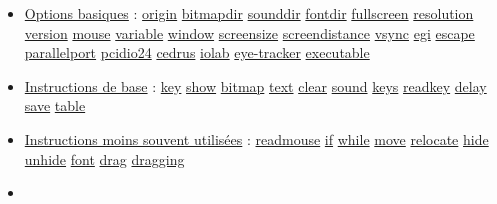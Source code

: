 \documentclass[
]{book}
\begin{document}
\begin{itemize}
\item
  \protect\hyperlink{options}{Options basiques} : \protect\hyperlink{options-origin}{origin} \textbar{} \protect\hyperlink{options-origin}{bitmapdir} \textbar{} \protect\hyperlink{options-origin}{sounddir} \textbar{} \protect\hyperlink{options-origin}{fontdir} \textbar{} \protect\hyperlink{options-fullscreen}{fullscreen} \textbar{} \protect\hyperlink{options-resolution}{resolution} \textbar{} \protect\hyperlink{options-version}{version} \textbar{} \protect\hyperlink{options-mouse}{mouse}\textbar{} \protect\hyperlink{options-variable}{variable} \textbar{} \protect\hyperlink{options-window}{window} \textbar{} \protect\hyperlink{options-screensize}{screensize} \textbar{} \protect\hyperlink{options-screendistance}{screendistance} \textbar{} \protect\hyperlink{options-vsync}{vsync} \textbar{} \protect\hyperlink{options-egi}{egi}\textbar{} \protect\hyperlink{options-escape}{escape}\textbar{} \protect\hyperlink{options-parallelport}{parallelport}\textbar{} \protect\hyperlink{options-pcidio24}{pcidio24}\textbar{} \protect\hyperlink{options-cedrus}{cedrus} \textbar{} \protect\hyperlink{options-iolab}{iolab}\textbar{} \protect\hyperlink{option-et}{eye-tracker}\textbar{} \protect\hyperlink{options-executable}{executable}
\item
  \protect\hyperlink{_commonly_used_instructions}{Instructions de base} : \protect\hyperlink{task-key}{key}\textbar{} \protect\hyperlink{task-show}{show} \textbar{} \protect\hyperlink{task-bitmap}{bitmap} \textbar{} \protect\hyperlink{task-text}{text}\textbar{} \protect\hyperlink{task-clear}{clear}\textbar{} \protect\hyperlink{task-sound}{sound}\textbar{} \protect\hyperlink{task-key}{keys}\textbar{} \protect\hyperlink{task-readkey}{readkey} \textbar{} \protect\hyperlink{task-delay}{delay} \textbar{} \protect\hyperlink{task-save}{save} \textbar{} \protect\hyperlink{task-table}{table}
\item
  \protect\hyperlink{less_often_used_instructions}{Instructions moins souvent utilisées} : \protect\hyperlink{task-readmouse}{readmouse} \textbar{} \protect\hyperlink{task-if}{if} \textbar{} \protect\hyperlink{task-while}{while} \textbar{} \protect\hyperlink{task-move}{move} \textbar{} \protect\hyperlink{task-relocate}{relocate} \textbar{} \protect\hyperlink{task-hide}{hide} \textbar{} \href{task-unhide}{unhide} \textbar{} \protect\hyperlink{task-font}{font} \protect\hyperlink{task_drag}{drag} \textbar{} \protect\hyperlink{task_dragging}{dragging}
\item

\end{itemize}
\end{document}
